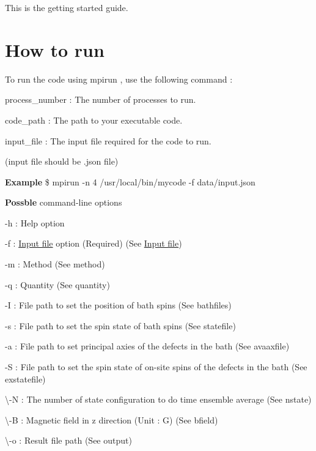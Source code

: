 This is the getting started guide.\hypertarget{GettingStarted_HowToRun}{}\section{How to run}\label{GettingStarted_HowToRun}
To run the code using {\ttfamily  mpirun }, use the following command \-:





\begin{DoxyItemize}
\item process\-\_\-number \-: The number of processes to run.
\item code\-\_\-path \-: The path to your executable code.
\item input\-\_\-file \-: The input file required for the code to run. \par

\begin{DoxyItemize}
\item (input file should be {\ttfamily .json} file)
\end{DoxyItemize}
\end{DoxyItemize}

{\bfseries Example} {\bfseries }  \$ mpirun -\/n 4 /usr/local/bin/mycode -\/f data/input.\-json 

{\bfseries Possble} command-\/line options {\bfseries } 


\begin{DoxyItemize}
\item -\/h \-: Help option
\item -\/f \-: \hyperlink{InputFile}{Input file} option (Required) (See \hyperlink{InputFile}{Input file})
\item -\/m \-: Method (See method)
\item -\/q \-: Quantity (See quantity)
\item -\/\-I \-: File path to set the position of bath spins (See bathfiles)
\item -\/s \-: File path to set the spin state of bath spins (See statefile)
\item -\/a \-: File path to set principal axies of the defects in the bath (See avaaxfile)
\item -\/\-S \-: File path to set the spin state of on-\/site spins of the defects in the bath (See exstatefile) 
\item \textbackslash{}-\/\-N \-: The number of state configuration to do time ensemble average (See nstate)
\item \textbackslash{}-\/\-B \-: Magnetic field in z direction (Unit \-: G) (See bfield)
\item \textbackslash{}-\/o \-: Result file path (See output)
\end{DoxyItemize}

